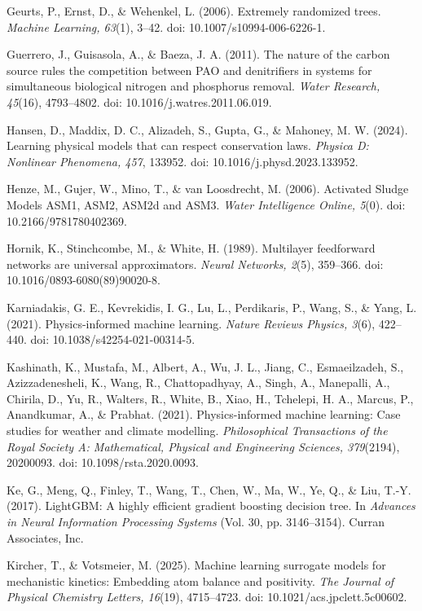 \documentclass[a4paper,fleqn]{cas-sc}
\begin{document}
\noindent Geurts, P., Ernst, D., \& Wehenkel, L. (2006). Extremely randomized trees. \textit{Machine Learning, 63}(1), 3--42. doi: 10.1007/s10994-006-6226-1.

\noindent Guerrero, J., Guisasola, A., \& Baeza, J. A. (2011). The nature of the carbon source rules the competition between PAO and denitrifiers in systems for simultaneous biological nitrogen and phosphorus removal. \textit{Water Research, 45}(16), 4793--4802. doi: 10.1016/j.watres.2011.06.019.

\noindent Hansen, D., Maddix, D. C., Alizadeh, S., Gupta, G., \& Mahoney, M. W. (2024). Learning physical models that can respect conservation laws. \textit{Physica D: Nonlinear Phenomena, 457}, 133952. doi: 10.1016/j.physd.2023.133952.

\noindent Henze, M., Gujer, W., Mino, T., \& van Loosdrecht, M. (2006). Activated Sludge Models ASM1, ASM2, ASM2d and ASM3. \textit{Water Intelligence Online, 5}(0). doi: 10.2166/9781780402369.

\noindent Hornik, K., Stinchcombe, M., \& White, H. (1989). Multilayer feedforward networks are universal approximators. \textit{Neural Networks, 2}(5), 359--366. doi: 10.1016/0893-6080(89)90020-8.

\noindent Karniadakis, G. E., Kevrekidis, I. G., Lu, L., Perdikaris, P., Wang, S., \& Yang, L. (2021). Physics-informed machine learning. \textit{Nature Reviews Physics, 3}(6), 422--440. doi: 10.1038/s42254-021-00314-5.

\noindent Kashinath, K., Mustafa, M., Albert, A., Wu, J. L., Jiang, C., Esmaeilzadeh, S., Azizzadenesheli, K., Wang, R., Chattopadhyay, A., Singh, A., Manepalli, A., Chirila, D., Yu, R., Walters, R., White, B., Xiao, H., Tchelepi, H. A., Marcus, P., Anandkumar, A., \& Prabhat. (2021). Physics-informed machine learning: Case studies for weather and climate modelling. \textit{Philosophical Transactions of the Royal Society A: Mathematical, Physical and Engineering Sciences, 379}(2194), 20200093. doi: 10.1098/rsta.2020.0093.

\noindent Ke, G., Meng, Q., Finley, T., Wang, T., Chen, W., Ma, W., Ye, Q., \& Liu, T.-Y. (2017). LightGBM: A highly efficient gradient boosting decision tree. In \textit{Advances in Neural Information Processing Systems} (Vol. 30, pp. 3146--3154). Curran Associates, Inc.

\noindent Kircher, T., \& Votsmeier, M. (2025). Machine learning surrogate models for mechanistic kinetics: Embedding atom balance and positivity. \textit{The Journal of Physical Chemistry Letters, 16}(19), 4715--4723. doi: 10.1021/acs.jpclett.5c00602.
\end{document}
